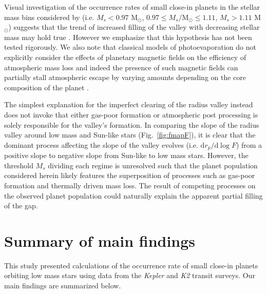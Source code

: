 \documentclass[twocolumn]{emulateapj}
\newcommand{\kepler}[1]{\emph{Kepler}#1}
\newcommand{\ktwo}[1]{\emph{K2}#1}
\begin{document}
Visual
investigation of the occurrence rates of small close-in planets in the stellar mass bins considered by
\cite{fulton18} (i.e. $M_s<0.97$ M$_{\odot}$, $0.97 \leq M_s/\text{M}_{\odot} \leq 1.11$, $M_s>1.11$ M$_{\odot}$)
suggests that the trend of increased filling of the valley with decreasing stellar mass may hold true   
\citep[c.f. Fig. 9;][]{fulton18}. However we emphasize that this hypothesis has not been tested rigorously.   
We also note that classical models of photoevaporation do not explicitly consider the effects of
planetary magnetic fields on the efficiency of atmospheric mass loss and indeed the presence of such magnetic
fields can partially stall atmospheric escape by varying amounts depending on the core composition of the
planet \citep{owen19}.

The simplest explanation for the imperfect clearing of the radius valley instead does not invoke that either
gas-poor formation or atmospheric post processing is solely responsible for the valley's formation.
In comparing the slope of the radius valley around low mass and Sun-like stars (Fig.~\ref{fig:fmapF}), it is
clear that the dominant process affecting the slope of the valley evolves (i.e. $\text{d}r_p/\text{d}\log{F}$)
from a positive slope to negative slope from Sun-like to low mass stars. However,
the threshold $M_s$ dividing each regime is unresolved such that the planet population considered herein
likely features the superposition of processes such as gas-poor formation and thermally driven mass loss. The
result of competing processes on the observed planet population could naturally explain the apparent
partial filling of the gap.


\section{Summary of main findings} \label{sect:conclusions}
This study presented calculations of the occurrence rate of small close-in planets orbiting low mass stars
using data from the \kepler{} and \ktwo{} transit surveys. Our main findings are summarized below.
\end{document}
